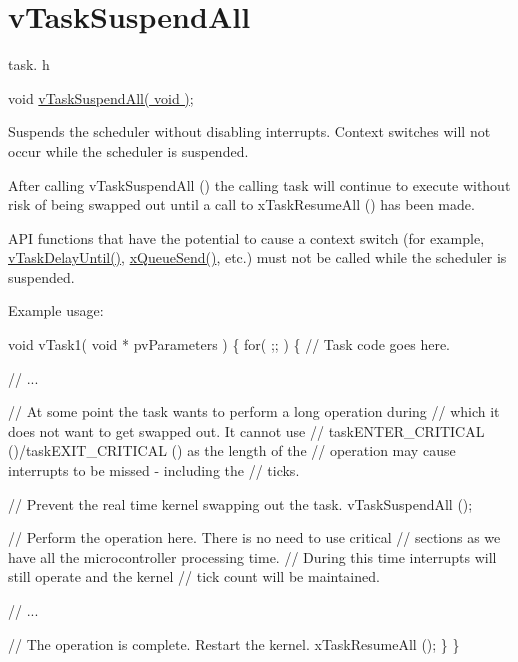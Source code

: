 \hypertarget{group__vTaskSuspendAll}{}\section{v\+Task\+Suspend\+All}
\label{group__vTaskSuspendAll}
task. h 
\begin{DoxyPre}void \hyperlink{task_8h_a366b302eba79d10b5ee2a3756f0fcc43}{vTaskSuspendAll( void )};\end{DoxyPre}


Suspends the scheduler without disabling interrupts. Context switches will not occur while the scheduler is suspended.

After calling v\+Task\+Suspend\+All () the calling task will continue to execute without risk of being swapped out until a call to x\+Task\+Resume\+All () has been made.

A\+PI functions that have the potential to cause a context switch (for example, \hyperlink{task_8h_a067da3e949e248096ec6c01f9cb75a47}{v\+Task\+Delay\+Until()}, \hyperlink{queue_8h_af7eb49d3249351176992950d9185abe9}{x\+Queue\+Send()}, etc.) must not be called while the scheduler is suspended.

Example usage\+: 
\begin{DoxyPre}
void vTask1( void * pvParameters )
\{
    for( ;; )
    \{
     // Task code goes here.\end{DoxyPre}



\begin{DoxyPre}     // ...\end{DoxyPre}



\begin{DoxyPre}     // At some point the task wants to perform a long operation during
     // which it does not want to get swapped out.  It cannot use
     // taskENTER\_CRITICAL ()/taskEXIT\_CRITICAL () as the length of the
     // operation may cause interrupts to be missed - including the
     // ticks.\end{DoxyPre}



\begin{DoxyPre}     // Prevent the real time kernel swapping out the task.
     vTaskSuspendAll ();\end{DoxyPre}



\begin{DoxyPre}     // Perform the operation here.  There is no need to use critical
     // sections as we have all the microcontroller processing time.
     // During this time interrupts will still operate and the kernel
     // tick count will be maintained.\end{DoxyPre}



\begin{DoxyPre}     // ...\end{DoxyPre}



\begin{DoxyPre}     // The operation is complete.  Restart the kernel.
     xTaskResumeAll ();
    \}
\}
  \end{DoxyPre}
 